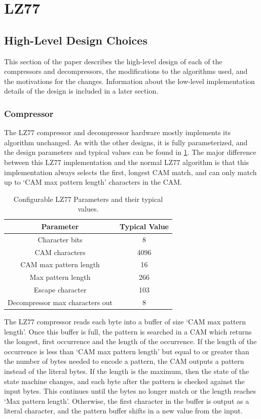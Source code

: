 \documentclass[doublespace,nopageskip]{VTthesis}
\begin{document}
\section{LZ77}\label{se:lz77}
\subsection{High-Level Design Choices}\label{se:lz77_design_choices}
This section of the paper describes the high-level design of each of the compressors and decompressors, the modifications to the algorithms used, and the motivations for the changes. Information about the low-level implementation details of the design is included in a later section.

\subsubsection{Compressor}\label{sss:lz77_compressor_design}
The LZ77 compressor and decompressor hardware mostly implements its algorithm unchanged. As with the other designs, it is fully parameterized, and the design parameters and typical values can be found in \ref{tab:lz77-configuration-table}. The major difference between this LZ77 implementation and the normal LZ77 algorithm is that this implementation always selects the first, longest CAM match, and can only match up to `CAM max pattern length' characters in the CAM.

\begin{table}[htb]
	\centering
	\caption{Configurable LZ77 Parameters and their typical values.}
	\begin{tabular}{cc}
	    \toprule
	    Parameter & Typical Value \\
	    \midrule
	    Character bits & 8 \\
	    \midrule
	    CAM characters & 4096 \\
	    \midrule
	    CAM max pattern length & 16 \\
	    \midrule
	    Max pattern length & 266 \\ 
	    \midrule
	    Escape character & 103 \\ 
	    \midrule
	    Decompressor max characters out & 8\\
	    \bottomrule
	\end{tabular}
	\label{tab:lz77-configuration-table}
\end{table}

The LZ77 compressor reads each byte into a buffer of size `CAM max pattern length'. Once this buffer is full, the pattern is searched in a CAM which returns the longest, first occurrence and the length of the occurrence. If the length of the occurrence is less than `CAM max pattern length' but equal to or greater than the number of bytes needed to encode a pattern, the CAM outputs a pattern instead of the literal bytes. If the length is the maximum, then the state of the state machine changes, and each byte after the pattern is checked against the input bytes. This continues until the bytes no longer match or the length reaches `Max pattern length'. Otherwise, the first character in the buffer is output as a literal character, and the pattern buffer shifts in a new value from the input.
\end{document}
